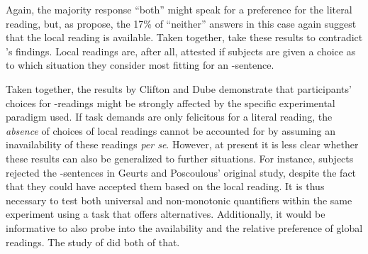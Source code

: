 \documentclass[fleqn,reqno,10pt,draft]{article}
\newcommand{\as}{\acro{as}}
\renewcommand{\es}{\acro{es}}
\begin{document}
\noindent Again, the majority response ``both'' might speak for a
preference for the literal reading, but, as
\citeauthor{CliftonDube2010:Embedded-Implic} propose, the 17\% of
``neither'' answers in this case again suggest that the local reading
is available. Taken together,
\citeauthor{CliftonDube2010:Embedded-Implic} take these results to
contradict \citeauthor{GeurtsPouscoulous2009:Embedded-Implic}'s
findings. Local readings are, after all, attested if subjects are
given a choice as to which situation they consider most fitting for an
\as-sentence.

Taken together, the results by Clifton and Dube demonstrate that
participants' choices for \as-readings might be strongly affected by
the specific experimental paradigm used. If task demands are only
felicitous for a literal reading, the \emph{absence} of choices of
local readings cannot be accounted for by assuming an inavailability
of these readings \emph{per se}. However, at present it is less clear whether these results
can also be generalized to further situations. For instance, subjects
rejected the \es-sentences in Geurts and Poscoulous' original study,
despite the fact that they could have accepted them based on the local
reading. It is thus necessary to test both universal and non-monotonic
quantifiers within the same experiment using a task that offers
alternatives. Additionally, it would be informative to also probe into
the availability and the relative preference of global readings. The
study of \citet{ChemlaSpector2010:Experimental-Ev} did both of that.

\subsection{\citet{ChemlaSpector2010:Experimental-Ev}}
\label{sec:Chemla-Spector}
\end{document}
